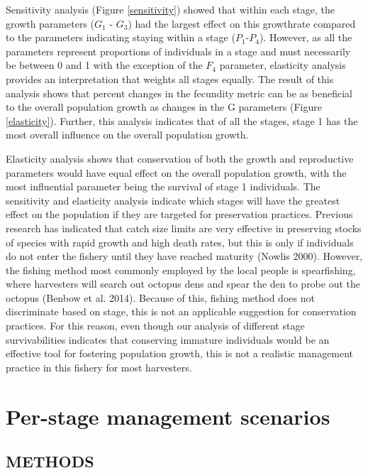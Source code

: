 \documentclass[
]{article}
\begin{document}
Sensitivity analysis (Figure \ref{sensitivity}) showed that within each stage, the growth parameters (\(G_1\) - \(G_3\)) had the largest effect on this growthrate compared to the parameters indicating staying within a stage (\(P_1\)-\(P_4\)). However, as all the parameters represent proportions of individuals in a stage and must necessarily be between 0 and 1 with the exception of the \(F_4\) parameter, elasticity analysis provides an interpretation that weights all stages equally. The result of this analysis shows that percent changes in the fecundity metric can be as beneficial to the overall population growth as changes in the G parameters (Figure \ref{elasticity}). Further, this analysis indicates that of all the stages, stage 1 has the most overall influence on the overall population growth.

Elasticity analysis shows that conservation of both the growth and reproductive parameters would have equal effect on the overall population growth, with the most influential parameter being the survival of stage 1 individuals. The sensitivity and elasticity analysis indicate which stages will have the greatest effect on the population if they are targeted for preservation practices. Previous research has indicated that catch size limits are very effective in preserving stocks of species with rapid growth and high death rates, but this is only if individuals do not enter the fishery until they have reached maturity (Nowlis 2000). However, the fishing method most commonly employed by the local people is spearfishing, where harvesters will search out octopus dens and spear the den to probe out the octopus (Benbow et al. 2014). Because of this, fishing method does not discriminate based on stage, this is not an applicable suggestion for conservation practices. For this reason, even though our analysis of different stage survivabilities indicates that conserving immature individuals would be an effective tool for fostering population growth, this is not a realistic management practice in this fishery for most harvesters.

\hypertarget{per-stage-management-scenarios}{%
\section{Per-stage management scenarios}\label{per-stage-management-scenarios}}

\hypertarget{methods}{%
\subsection{METHODS}\label{methods}}
\end{document}
